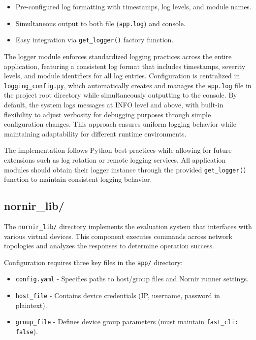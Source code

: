         \begin{itemize}
            \item Pre-configured log formatting with timestamps, log levels, and module names.
            \item Simultaneous output to both file (\texttt{app.log}) and console.
            \item Easy integration via \texttt{get\_logger()} factory function.
        \end{itemize}

        The logger module enforces standardized logging practices across the entire application, featuring a consistent 
        log format that includes timestamps, severity levels, and module identifiers for all log entries. Configuration is 
        centralized in \texttt{logging\_config.py}, which automatically creates and manages the \texttt{app.log} file in the 
        project root directory while simultaneously outputting to the console. By default, the system logs messages at INFO 
        level and above, with built-in flexibility to adjust verbosity for debugging purposes through simple configuration 
        changes. This approach ensures uniform logging behavior while maintaining adaptability for different runtime 
        environments.

        The implementation follows Python best practices while allowing for future extensions such as log rotation 
        or remote logging services. All application modules should obtain their logger instance through the provided 
        \texttt{get\_logger()} function to maintain consistent logging behavior.

    \subsection{nornir\_lib/}

        The \texttt{nornir\_lib/} directory implements the evaluation system that interfaces with various virtual devices. 
        This component executes commands across network topologies and analyzes the responses to determine operation 
        success.

        Configuration requires three key files in the \texttt{app/} directory:
        \begin{itemize}
            \item \texttt{config.yaml} - Specifies paths to host/group files and Nornir runner settings.
            \item \texttt{host\_file} - Contains device credentials (IP, username, password in plaintext).
            \item \texttt{group\_file} - Defines device group parameters (must maintain \texttt{fast\_cli: false}).
        \end{itemize}

